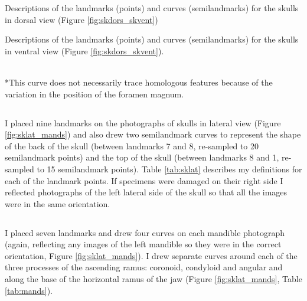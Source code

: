 \begin{table}[h]
	\caption[Skulls: dorsal landmarks]
		{Descriptions of the landmarks (points) and curves (semilandmarks) for the skulls in dorsal view (Figure
		\ref{fig:skdors_skvent})} 
	
	\label{tab:skdors}
\end{table}

\begin{table}[!htb] %
\caption[Skulls: ventral landmarks]
		{Descriptions of the landmarks (points) and curves (semilandmarks) for the skulls in ventral view (Figure \ref{fig:skdors_skvent}).} 

\label{tab:skvent}
\\
*This curve does not necessarily trace homologous features because of the variation in the position of the foramen magnum.
\end{table}

\subsection{}
	I placed nine landmarks on the photographs of skulls in lateral view (Figure \ref{fig:sklat_mands}) and also drew two semilandmark curves to represent the shape of the back of the skull (between landmarks 7 and 8, re-sampled to 20 semilandmark points) and the top of the skull (between landmarks 8 and 1, re-sampled to 15 semilandmark points). Table \ref{tab:sklat} describes my definitions for each of the landmark points.
	If specimens were damaged on their right side I reflected photographs of the left lateral side of the skull so that all the images were in the same orientation.


\subsection{}
	I placed seven landmarks and drew four curves on each mandible photograph (again, reflecting any images of the left mandible so they were in the correct orientation, Figure \ref{fig:sklat_mands}). I drew separate curves around each of the three processes of the ascending ramus: coronoid, condyloid and angular and along the base of the horizontal ramus of the jaw (Figure \ref{fig:sklat_mands}, Table \ref{tab:mands}). 	


